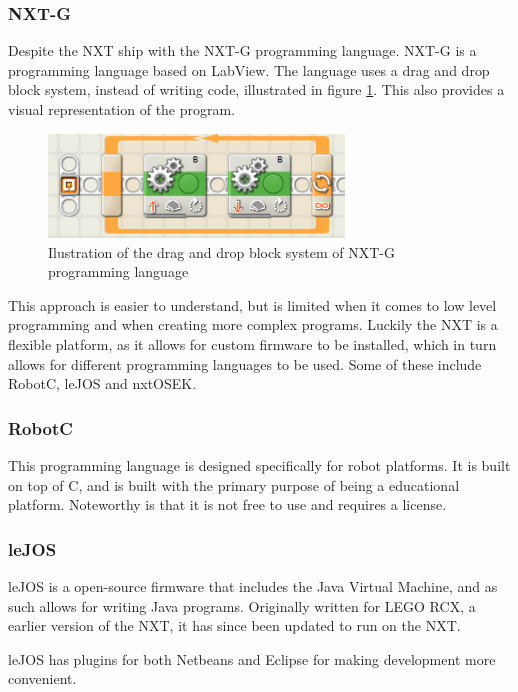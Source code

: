 \subsubsection{NXT-G}
Despite the NXT ship with the NXT-G programming language. NXT-G is a programming language based on LabView\cite{LabView}. The language uses a drag and drop block system, instead of writing code, illustrated in figure \ref{NXT-G}. This also provides a visual representation of the program.

\begin{figure}[H]
    \centering
    \includegraphics[width=0.7\textwidth]{Images/Software/Mindstorms/mindstorms_block.png}
    \caption{Ilustration of the drag and drop block system of NXT-G programming language}
    \label{NXT-G}
\end{figure}

This approach is easier to understand, but is limited when it comes to low level programming and when creating more complex programs. Luckily the NXT is a flexible platform, as it allows for custom firmware to be installed, which in turn allows for different programming languages to be used.
Some of these include RobotC\cite{RobotC}, leJOS\cite{leJOS} and nxtOSEK\cite{nxtOSEK}.

\subsubsection{RobotC}
This programming language is designed specifically for robot platforms. It is built on top of C, and is built with the primary purpose of being a educational platform. Noteworthy is that it is not free to use and requires a license.

\subsubsection{leJOS}
leJOS is a open-source firmware that includes the Java Virtual Machine\cite{Java}, and as such allows for writing Java programs. Originally written for LEGO RCX, a earlier version of the NXT, it has since been updated to run on the NXT.

leJOS has plugins for both Netbeans\cite{Netbeans} and Eclipse\cite{Eclipse} for making development more convenient.

